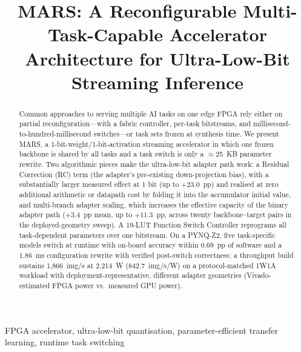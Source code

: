 \documentclass[conference]{IEEEtran}
\begin{document}
\title{MARS: A Reconfigurable Multi-Task-Capable Accelerator Architecture for Ultra-Low-Bit Streaming Inference}

\author{
}

\maketitle

\begin{abstract}
Common approaches to serving multiple AI tasks on one edge FPGA rely either on partial reconfiguration---with a fabric controller, per-task bitstreams, and millisecond-to-hundred-millisecond switches---or task sets frozen at synthesis time. We present MARS, a 1-bit-weight/1-bit-activation streaming accelerator in which one frozen backbone is shared by all tasks and a task switch is only a $\approx$25~KB parameter rewrite. Two algorithmic pieces make the ultra-low-bit adapter path work: a Residual Correction (RC) term (the adapter's pre-existing down-projection bias), with a substantially larger measured effect at 1 bit (up to $+23.0$~pp) and realised at zero additional arithmetic or datapath cost by folding it into the accumulator initial value, and multi-branch adapter scaling, which increases the effective capacity of the binary adapter path ($+3.4$~pp mean, up to $+11.3$~pp, across twenty backbone--target pairs in the deployed-geometry sweep). A 19-LUT Function Switch Controller reprograms all task-dependent parameters over one bitstream. On a PYNQ-Z2, five task-specific models switch at runtime with on-board accuracy within $0.69$~pp of software and a $1.86$~ms configuration rewrite with verified post-switch correctness; a throughput build sustains 1{,}866~img/s at 2.214~W (842.7~img/s/W) on a protocol-matched 1W1A workload with deployment-representative, different adapter geometries (Vivado-estimated FPGA power vs.\ measured GPU power).
\end{abstract}

\begin{IEEEkeywords}
FPGA accelerator, ultra-low-bit quantisation, parameter-efficient transfer learning, runtime task switching
\end{IEEEkeywords}
\end{document}
